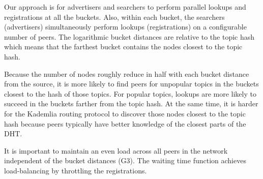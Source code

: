 Our approach is for advertisers and searchers to perform parallel lookups and registrations at all the buckets. Also, within each bucket, the searchers (advertisers) simultaneously perform lookups (registrations) on a configurable number of peers. The logarithmic bucket distances are relative to the topic hash which means that the farthest bucket contains the nodes closest to the topic hash.  

Because the number of nodes roughly reduce in half with each bucket distance from the source, it is more likely to find peers for unpopular topics in the buckets closest to the hash of those topics. For popular topics, lookups are more likely to succeed in the buckets farther from the topic hash. At the same time, it is harder for the Kademlia routing protocol to discover those nodes closest to the topic hash because peers typically have better knowledge of the closest parts of the DHT. 

It is important to maintain an even load across all peers in the network independent of the bucket distances (G3). The waiting time function achieves load-balancing by throttling the registrations. 


